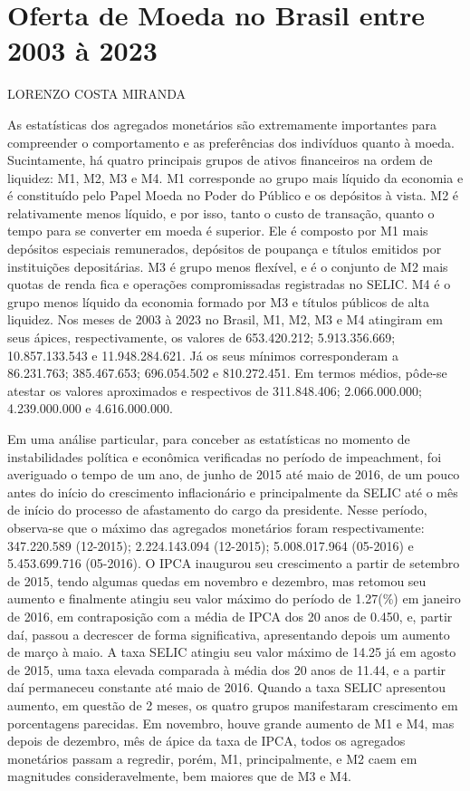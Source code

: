 \documentclass[12pt]{article}
\author{Lorenzo Costa Miranda}
\date{} %
\begin{document}
\section*{Oferta de Moeda no Brasil entre 2003 à 2023}
\hspace{4.5cm} LORENZO COSTA MIRANDA
\vspace*{5pt}

As estatísticas dos agregados monetários são extremamente importantes para compreender o comportamento e as preferências dos indivíduos quanto à moeda. Sucintamente, há quatro principais grupos de ativos financeiros na ordem de liquidez: M1, M2, M3 e M4. M1 corresponde ao grupo mais líquido da economia e é constituído pelo Papel Moeda no Poder do Público e os depósitos à vista. M2 é relativamente menos líquido, e por isso, tanto o custo de transação, quanto o tempo para se converter em moeda é superior. Ele é composto por M1 mais depósitos especiais remunerados, depósitos de poupança e títulos emitidos por instituições depositárias. M3 é grupo menos flexível, e é o conjunto de M2 mais quotas de renda fica e operações compromissadas registradas no SELIC. M4 é o grupo menos líquido da economia formado por M3 e títulos públicos de alta liquidez. Nos meses de 2003 à 2023 no Brasil, M1, M2, M3 e M4 atingiram em seus ápices, respectivamente, os valores de 653.420.212; 5.913.356.669; 10.857.133.543 e 11.948.284.621. Já os seus mínimos corresponderam a 86.231.763; 385.467.653; 696.054.502 e 810.272.451. Em termos médios, pôde-se atestar os valores aproximados e respectivos de 311.848.406; 2.066.000.000; 4.239.000.000 e 4.616.000.000.

Em uma análise particular, para conceber as estatísticas no momento de instabilidades política e econômica verificadas no período de impeachment, foi averiguado o tempo de um ano, de junho de 2015 até maio de 2016, de um pouco antes do início do crescimento inflacionário e principalmente da SELIC até o mês de início do processo de afastamento do cargo da presidente. Nesse período, observa-se que o máximo das agregados monetários foram respectivamente: 347.220.589 (12-2015); 2.224.143.094 (12-2015); 5.008.017.964 (05-2016) e 5.453.699.716 (05-2016). O IPCA inaugurou seu crescimento a partir de setembro de 2015, tendo algumas quedas em novembro e dezembro, mas retomou seu aumento e finalmente atingiu seu valor máximo do período de 1.27(\%) em janeiro de 2016, em contraposição com a média de IPCA dos 20 anos de 0.450, e, partir daí, passou a decrescer de forma significativa, apresentando depois um aumento de março à maio. A taxa SELIC atingiu seu valor máximo de 14.25 já em agosto de 2015, uma taxa elevada comparada à média dos 20 anos de 11.44, e a partir daí permaneceu constante até maio de 2016. Quando a taxa SELIC apresentou aumento, em questão de 2 meses, os quatro grupos manifestaram crescimento em porcentagens parecidas. Em novembro, houve grande aumento de M1 e M4, mas depois de dezembro, mês de ápice da taxa de IPCA, todos os agregados monetários passam a regredir, porém, M1, principalmente, e M2 caem em magnitudes consideravelmente, bem maiores que de M3 e M4.
\end{document}
